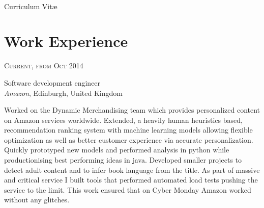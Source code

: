 \documentclass[10pt]{article} %
\begin{document}
\color{text1} %


\par{\\ %
{\color{headings} Curriculum {Vit\ae}\\[15pt]\par} %
	

\begin{minipage}[t]{0.5\textwidth} %
\vspace{0pt} %
	

\section{Work Experience} 


{\raggedleft\textsc{Current, from Oct 2014}\par}

{\raggedright\large Software development engineer\\
\textit{Amazon}, Edinburgh, United Kingdom\\[5pt]}

\normalsize{Worked on the Dynamic Merchandising team 
which provides personalized content on Amazon services worldwide.
Extended, a heavily human heuristics based, recommendation 
ranking system with machine learning models allowing flexible 
optimization as well as better customer experience via accurate personalization.
Quickly prototyped new models and performed analysis in python 
while productionising best performing ideas in java.
Developed smaller projects to detect adult content and to infer book language from the title.
As part of massive and critical service I built tools that performed 
automated load tests pushing the service to the limit. 
This work ensured that on Cyber Monday Amazon worked without any glitches.}\\


\end{minipage}}
\end{document}
